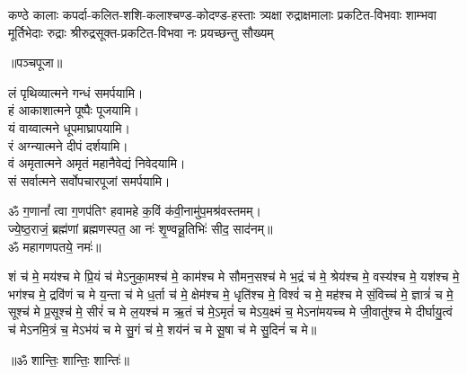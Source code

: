 {कण्ठे कालाः कपर्दा-कलित-शशि-कलाश्चण्ड-कोदण्ड-हस्ताः}
{त्र्यक्षा रुद्राक्षमालाः प्रकटित-विभवाः शाम्भवा मूर्तिभेदाः}
{रुद्राः श्रीरुद्रसूक्त-प्रकटित-विभवा नः प्रयच्छन्तु सौख्यम्}

\centerline{॥पञ्चपूजा॥}

लं पृथिव्यात्मने गन्धं समर्पयामि।\\
हं आकाशात्मने पूष्पैः पूजयामि।\\
यं वाय्वात्मने धूपमाघ्रापयामि।\\
रं अग्न्यात्मने दीपं दर्शयामि।\\
वं अमृतात्मने अमृतं महानैवेद्यं निवेदयामि।\\
सं सर्वात्मने सर्वोपचारपूजां समर्पयामि।

ॐ ग॒णानां᳚ त्वा ग॒णप॑तिꣳ हवामहे क॒विं क॑वी॒नामु॑प॒\-मश्र॑वस्तमम्। \\
ज्ये॒ष्ठ॒राजं॒ ब्रह्म॑णां ब्रह्मणस्पत॒ आ नः॑ शृ॒ण्वन्नू॒तिभिः॑ सीद॒ साद॑नम्॥ \\
ॐ महागणपतये॒ नमः॑॥ 


शं च॑ मे॒ मय॑श्च मे प्रि॒यं च॑ मेऽनुका॒मश्च॑ मे॒ काम॑श्च मे सौमन॒सश्च॑ मे भ॒द्रं च॑ मे॒ श्रेय॑श्च मे॒ वस्य॑श्च मे॒ यश॑श्च मे॒ भग॑श्च मे॒ द्रवि॑णं च मे य॒न्ता च॑ मे ध॒र्ता च॑ मे॒ क्षेम॑श्च मे॒ धृति॑श्च मे॒ विश्वं॑ च मे॒ मह॑श्च मे सं॒विच्च॑ मे॒ ज्ञात्रं॑ च मे॒ सूश्च॑ मे प्र॒सूश्च॑ मे॒ सीरं॑ च मे ल॒यश्च॑ म ऋ॒तं च॑ मे॒ऽमृतं॑ च मेऽय॒क्ष्मं च॒ मेऽना॑मयच्च मे जी॒वातु॑श्च मे दीर्घायु॒त्वं च॑ मेऽनमि॒त्रं च॒ मेऽभ॑यं च मे सु॒गं च॑ मे॒ शय॑नं च मे सू॒षा च॑ मे सु॒दिनं॑ च मे॥
\centerline{॥ॐ शान्तिः॒ शान्तिः॒ शान्तिः॑॥}



\newcommand{\cham}[3]{\refstepcounter{cj}%
#1\\
अनेन \textbf{#2}-वार-जपेन भगवान् सर्वात्मकः\\
\underline{\textbf{#3}} सुप्रीतः सुप्रसन्नो वरदो भवतु॥\devanumber{\arabic{cj}}॥}

\newcommand{\rudram}[1]{\sect{रुद्रप्रश्नः}


ॐ नमो भगवते॑ रुद्रा॒य॥\\
 नम॑स्ते रुद्र म॒न्यव॑ उ॒तो त॒ इष॑वे॒ नमः॑। 
% 
$\ldots$\\
#1\\
$\ldots$\\

त्र्य॑म्बकं यजामहे सुग॒न्धिं पु॑ष्टि॒वर्ध॑नम्।\\ उ॒र्वा॒रु॒कमि॑व॒ बन्ध॑नान्मृ॒त्योर्मु॑क्षीय॒ माऽमृता᳚त्॥ 

}

